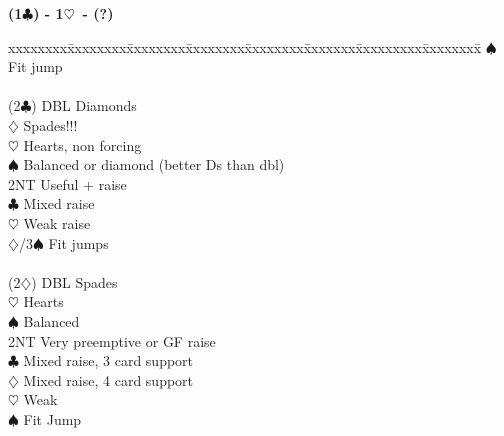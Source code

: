 \documentclass[10pt]{article}
\renewcommand{\c}{$\clubsuit$}
\renewcommand{\d}{$\diamondsuit$}
\newcommand{\h}{$\heartsuit$}
\newcommand{\s}{$\spadesuit$}
\newcommand{\x}{DBL}
\newenvironment{bidtable}[1][]
{\textbf{#1}
  \begin{adjustwidth}{1em}{}
    \addvspace{2pt}
    \begin{tabbing}
      xxxxxxxx\=xxxxxxxx\=xxxxxxxx\=xxxxxxxx\=xxxxxxxx\=xxxxxxx\=xxxxxxxxx\=xxxxxxxx\=\kill}
{\end{tabbing}\end{adjustwidth}\bigskip}%
\begin{document}
\begin{bidtable}[(1\c) - 1\h\ - (?)]
       \s     \> Fit jump                            \\
                                                              \\
(2\c)  \> \x      \> Diamonds                                 \\
       \d     \> Spades!!!                                \\
       \h     \> Hearts, non forcing                      \\
       \s     \> Balanced or diamond (better Ds than dbl) \\
       \> 2NT     \> Useful + raise                           \\
       \c     \> Mixed raise                              \\
       \h     \> Weak raise                               \\
       \d/3\s \> Fit jumps                                \\
                                                              \\
(2\d)  \> \x     \> Spades                                   \\
       \h     \> Hearts                                   \\
       \s     \> Balanced                                 \\
       \> 2NT     \> Very preemptive or GF raise              \\
       \c     \> Mixed raise, 3 card support              \\
       \d     \> Mixed raise, 4 card support              \\
       \h     \> Weak                                     \\
       \s     \> Fit Jump
\end{bidtable}
\end{document}
